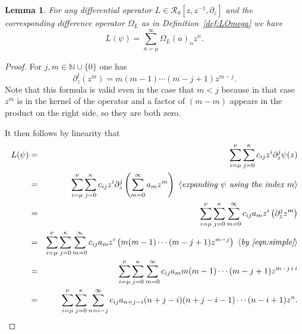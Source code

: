 \documentclass{amsart}
\newtheorem{lemma}[theorem]{Lemma}
\theoremstyle{definition}
\theoremstyle{remark}
\numberwithin{equation}{section}
\def\R{\mathcal{R}}
\def\N{\mathbb{N}}
\def\zmin{\mu}
\def\zmax{\nu}
\def\dmax{\kappa}
\def\hexpl#1{\hbox{ $\langle$\textit{#1}$\rangle$}}
\begin{document}
\begin{lemma}\label{lem:main} For any differential operator $L\in\R_0[z,z^{-1},\partial_z]$ and
  the corresponding difference operator $\Omega_L$ as in
  Definition~\ref{def:LOmega} we have
$$
L(\psi)=\sum_{n=\zmin}^{\infty} \Omega_L(a)_nz^n.
$$
\end{lemma}
\begin{proof}
For $j,m\in\N\cup\{0\}$ one has
\begin{equation}\label{eqn:simple}
\partial_z^{j}(z^m)
=
m(m-1)\cdots(m-j+1)z^{m-j}.
\end{equation}
Note that this formula is valid even in the case that $m<j$ because in
that case $z^m$ is in the kernel of the operator and a factor of
$(m-m)$ appears in the product on the right side, so they are both zero.

It then follows by linearity that
\begin{eqnarray*}
  L(\psi)&=&\sum_{i=\zmin}^{\zmax}\sum_{j=0}^{\dmax}c_{ij}z^i\partial_z^j\psi(z)\\
         &=&\sum_{i=\zmin}^{\zmax}\sum_{j=0}^{\dmax}
             c_{ij}z^i\partial_z^j\left( \sum_{m=0}^\infty a_m z^m\right)
  \hexpl{expanding $\psi$ using the index $m$}\\
         &=&\sum_{i=\zmin}^{\zmax}\sum_{j=0}^{\dmax}\sum_{m=0}^\infty c_{ij}a_mz^i\left(\partial_z^jz^m\right)\\
  &=&\sum_{i=\zmin}^{\zmax}\sum_{j=0}^{\dmax}\sum_{m=0}^\infty c_{ij}a_mz^i\left( m(m-1)\cdots(m-j+1)z^{m-j}\right)
\hexpl{by \eqref{eqn:simple}}\\
\phantom{L(\psi)}  &=&\sum_{i=\zmin}^{\zmax}\sum_{j=0}^{\dmax}\sum_{m=0}^\infty c_{ij}a_m
      m(m-1)\cdots(m-j+1)z^{m-j+i}\\
  &=&\sum_{i=\zmin}^{\zmax}\sum_{j=0}^{\dmax}\sum_{n=i-j}^\infty c_{ij}a_{n+j-i}
      (n+j-i)(n+j-i-1)\cdots(n-i+1)z^{n}.
\end{eqnarray*}


\end{proof}
\end{document}
